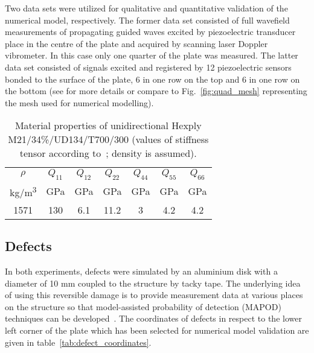 \documentclass[preprint,12pt]{elsarticle}
\begin{document}
	Two data sets were utilized for qualitative and quantitative validation of the numerical model, respectively. The former data set consisted of full wavefield measurements of propagating guided waves excited by piezoelectric transducer place in the centre of the plate and acquired by scanning laser Doppler vibrometer. In this case only one quarter of the plate was measured. The latter data set consisted of signals excited and registered by 12 piezoelectric sensors bonded to the surface of the plate, 6 in one row on the top and 6 in one row on the bottom (see \cite{Moll2018} for more details or compare to Fig.~\ref{fig:quad_mesh} representing the mesh used for numerical modelling).
	\begin{table}
		\renewcommand{\arraystretch}{1.3}
		\centering \footnotesize
		\caption{Material properties of unidirectional Hexply M21/34\%/UD134/T700/300 (values of stiffness tensor according to~\cite{Moll2018}; density is assumed).}
		\begin{tabular}{ccccccc} 
			\toprule
			$\rho$ & $Q_{11}$ & $Q_{12}$  & $Q_{22}$ & $Q_{44}$ & $Q_{55}$ & $Q_{66}$\\
			kg/m\textsuperscript{3} &GPa& GPa  & GPa  & GPa& GPa & GPa\\ 
			\midrule
			1571 &130& 6.1& 11.2 & 3 & 4.2 & 4.2\\
			\bottomrule 
		\end{tabular} 
		\label{tab:mat_prop}
	\end{table}
	\subsection{Defects}
	In both experiments, defects were simulated by an aluminium disk with a diameter of 10 mm coupled to the structure by tacky tape. The underlying idea of using this reversible damage is to provide measurement data at various places on the structure so that model-assisted probability of detection (MAPOD) techniques can be developed~\cite{Eckstein2012}. The coordinates of defects in respect to the lower left corner of the plate which has been selected for numerical model validation are given in table~\ref{tab:defect_coordinates}.
	
\end{document}
